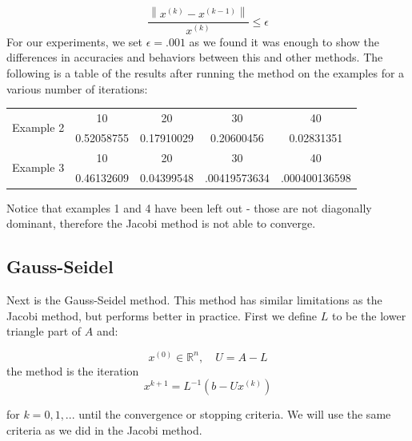\documentclass[11pt]{article}	%
\newcommand\norm[1]{\left\lVert#1\right\rVert}
\begin{document}
    \begin{equation}
        \frac{\norm{x^{(k)} - x^{(k-1)}}}{x^{(k)}} \leq \epsilon
    \end{equation}
    For our experiments, we set $\epsilon = .001$ as we found it was enough to show the differences in accuracies and behaviors between this and other methods. The following is a table of the results after running the method on the examples for a various number of iterations:
    \begin{center}
     \label{tab:title}
        \begin{tabular}{||c|c|c|c|c||}
            \hline
            \multirow{2}{5em}{Example 2} & 10 & 20 & 30 & 40 \\ [.25em]
            & 0.52058755 & 0.17910029 & 0.20600456 & 0.02831351 \\ [.25em]
            \hline \hline
            \multirow{2}{5em}{Example 3} & 10 & 20 & 30 & 40 \\ [.25em]
            & 0.46132609 & 0.04399548 & .00419573634 & .000400136598 \\ [.25em]
            \hline
        \end{tabular}
    \end{center}

    Notice that examples 1 and 4 have been left out - those are not diagonally dominant, therefore the Jacobi method
    is not able to converge.

\subsection{Gauss-Seidel}
Next is the Gauss-Seidel method. This method has similar limitations as the Jacobi method, but performs better in practice.
First we define $L$ to be the lower triangle part of $A$ and:

\begin{equation}\label{eq:jacobi-eq-1}
     x^{(0)}\in {\mathbb R}^n, \quad U = A - L
\end{equation}
the method is the iteration
\begin{equation}\label{eq:jacobi-eq-1}
    x^{k+1} = L^{-1}(b - Ux^{(k)})
\end{equation}

for $k = 0, 1, ...$ until the convergence or stopping criteria. We will use the same criteria as we did in the Jacobi method.
\end{document}
